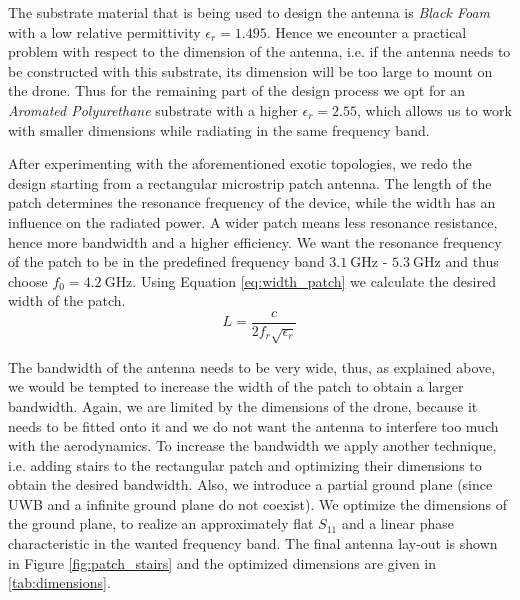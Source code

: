 \documentclass[a4paper]{article}        %
\begin{document}
	The substrate material that is being used to design the antenna is \textit{Black Foam} with a low relative permittivity $\epsilon_r = 1.495$. Hence we encounter a practical problem with respect to the dimension of the antenna, i.e. if the antenna needs to be constructed with this substrate, its dimension will be too large to mount on the drone. Thus for the remaining part of the design process we opt for an \textit{Aromated Polyurethane} substrate with a higher $\epsilon_r = 2.55$, which allows us to work with smaller dimensions while radiating in the same frequency band. 

	After experimenting with the aforementioned exotic topologies, we redo the design starting from a rectangular microstrip patch antenna. The length of the patch determines the resonance frequency of the device, while the width has an influence on the radiated power. A wider patch means less resonance resistance, hence more bandwidth and a higher efficiency. 
	We want the resonance frequency of the patch to be in the predefined frequency band $\SI{3.1}{\giga\hertz}$ - $\SI{5.3}{\giga\hertz}$ and thus choose $f_0 = \SI{4.2}{\giga\hertz}$. Using Equation \eqref{eq:width_patch} we calculate the desired width of the patch.
	\begin{equation} 
	L = \frac{c}{2 f_r \sqrt{\epsilon_r}}
	\label{eq:width_patch}
	\end{equation}

  The bandwidth of the antenna needs to be very wide, thus, as explained above, we would be tempted to increase the width of the patch to obtain a larger bandwidth. Again, we are limited by the dimensions of the drone, because it needs to be fitted onto it and we do not want the antenna to interfere too much with the aerodynamics. To increase the bandwidth we apply another technique, i.e. adding stairs to the rectangular patch and optimizing their dimensions to obtain the desired bandwidth. Also, we introduce a partial ground plane (since UWB and a infinite ground plane do not coexist). We optimize the dimensions of the ground plane, to realize an approximately flat $S_{11}$ and a linear phase characteristic in the wanted frequency band. The final antenna lay-out is shown in Figure \ref{fig:patch_stairs} and the optimized dimensions are given in \autoref{tab:dimensions}.
\end{document}
